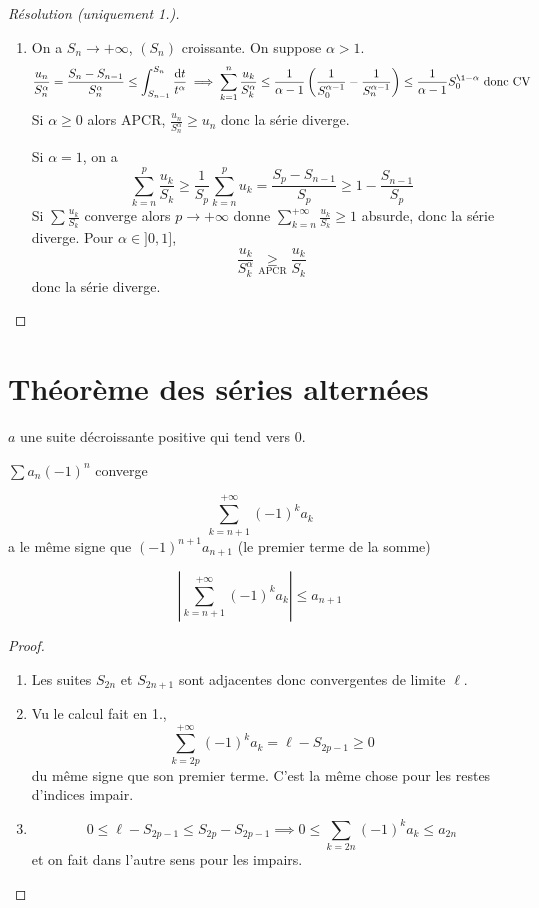 \begin{proof}[Résolution (uniquement 1.)]~
    \begin{enumerate}
        \item On a $S_n\longrightarrow+\infty$, $(S_n)$ croissante. On suppose $\alpha>1$. \[
                \frac{u_n}{S_n^\alpha}=\frac{S_n-S_{n-1}}{S_n^\alpha}\leq \int_{S_{n-1}}^{S_n}\frac{\diff t}{t^\alpha}\implies \sum_{k=1}^n\frac{u_k}{S_k^\alpha}\leq \frac1{\alpha-1} \left( \frac1{S_0^{\alpha-1}}-\frac1{S_n^{\alpha-1}} \right)\leq \frac1{\alpha-1}S_0^{\1-\alpha} \text{ donc CV }
            \]
            Si $\alpha\geq 0$ alors APCR, $\frac{u_n}{S_n^\alpha}\geq u_n$ donc la série diverge.

            Si $\alpha=1$, on a \[
                \sum_{k=n}^p\frac{u_k}{S_k}\geq \frac1{S_p}\sum_{k=n}^pu_k=\frac{S_p-S_{n-1}}{S_p}\geq 1-\frac{S_{n-1}}{S_p}
            \]
            Si $\sum\frac{u_k}{S_k}$ converge alors $p\longrightarrow+\infty$ donne $\sum_{k=n}^{+\infty}\frac{u_k}{S_k}\geq 1$ absurde, donc la série diverge.
            Pour $\alpha\in ]0, 1]$, \[
                \frac{u_k}{S_k^\alpha}\underset{\text{APCR}}\geq \frac{u_k}{S_k}
            \]
            donc la série diverge.
    \end{enumerate}
\end{proof}

\section{Théorème des séries alternées}

\begin{thm}
    \Hyp $a$ une suite décroissante positive qui tend vers $0$.
    \begin{concenum}
    \item $\sum a_n(-1)^n$ converge
    \item \[
            \sum_{k=n+1}^{+\infty}(-1)^ka_k
        \]
        a le même signe que $(-1)^{n+1}a_{n+1}$ (le premier terme de la somme)
    \item \[
            \left|  \sum_{k=n+1}^{+\infty}(-1)^ka_k \right|\leq a_{n+1}
    \]
    \end{concenum}
\end{thm}

\begin{proof}~
    \begin{enumerate}
        \item Les suites $S_{2n}$ et $S_{2n+1}$ sont adjacentes donc convergentes de limite $\ell$.
        \item Vu le calcul fait en 1., \[
                \sum_{k=2p}^{+\infty}(-1)^ka_k=\ell-S_{2p-1}\geq 0
            \]
            du même signe que son premier terme. C'est la même chose pour les restes d'indices impair.
        \item \[ 0\leq \ell-S_{2p-1}\leq S_{2p}-S_{2p-1}\implies 0\leq \sum_{k=2n}(-1)^ka_k\leq a_{2n}\]
            et on fait dans l'autre sens pour les impairs.
    \end{enumerate}
\end{proof}

